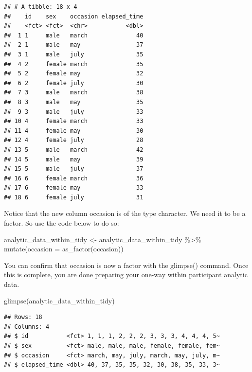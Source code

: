 \documentclass[
]{krantz}
\makeatletter
\newenvironment{Shaded}{\begin{snugshade}}{\end{snugshade}}
\newcommand{\AttributeTok}[1]{\textcolor[rgb]{0.61,0.61,0.61}{#1}}
\newcommand{\FunctionTok}[1]{\textcolor[rgb]{0,0,0}{#1}}
\newcommand{\NormalTok}[1]{#1}
\newcommand{\OtherTok}[1]{\textcolor[rgb]{0.37,0.37,0.37}{#1}}
\newcommand{\SpecialCharTok}[1]{\textcolor[rgb]{0,0,0}{#1}}
\newenvironment{kframe}{%
\medskip{}
\setlength{\fboxsep}{.8em}
 \def\at@end@of@kframe{}%
 \ifinner\ifhmode%
  \def\at@end@of@kframe{\end{minipage}}%
  \begin{minipage}{\columnwidth}%
 \fi\fi%
 \def\FrameCommand##1{\hskip\@totalleftmargin \hskip-\fboxsep
 \colorbox{shadecolor}{##1}\hskip-\fboxsep
     \hskip-\linewidth \hskip-\@totalleftmargin \hskip\columnwidth}%
 \MakeFramed {\advance\hsize-\width
   \@totalleftmargin\z@ \linewidth\hsize
   \@setminipage}}%
 {\par\unskip\endMakeFramed%
 \at@end@of@kframe}
\renewenvironment{Shaded}{\begin{kframe}}{\end{kframe}}
\makeatother
\begin{document}
\begin{verbatim}
## # A tibble: 18 x 4
##    id    sex    occasion elapsed_time
##    <fct> <fct>  <chr>           <dbl>
##  1 1     male   march              40
##  2 1     male   may                37
##  3 1     male   july               35
##  4 2     female march              35
##  5 2     female may                32
##  6 2     female july               30
##  7 3     male   march              38
##  8 3     male   may                35
##  9 3     male   july               33
## 10 4     female march              33
## 11 4     female may                30
## 12 4     female july               28
## 13 5     male   march              42
## 14 5     male   may                39
## 15 5     male   july               37
## 16 6     female march              36
## 17 6     female may                33
## 18 6     female july               31
\end{verbatim}

Notice that the new column occasion is of the type character. We need it to be a factor. So use the code below to do so:

\begin{Shaded}
\begin{Highlighting}[]
\NormalTok{analytic\_data\_within\_tidy }\OtherTok{\textless{}{-}}\NormalTok{ analytic\_data\_within\_tidy }\SpecialCharTok{\%\textgreater{}\%}
  \FunctionTok{mutate}\NormalTok{(}\AttributeTok{occasion =} \FunctionTok{as\_factor}\NormalTok{(occasion))}
\end{Highlighting}
\end{Shaded}

You can confirm that occasion is now a factor with the glimpse() command. Once this is complete, you are done preparing your one-way within participant analytic data.

\begin{Shaded}
\begin{Highlighting}[]
\FunctionTok{glimpse}\NormalTok{(analytic\_data\_within\_tidy)}
\end{Highlighting}
\end{Shaded}

\begin{verbatim}
## Rows: 18
## Columns: 4
## $ id           <fct> 1, 1, 1, 2, 2, 2, 3, 3, 3, 4, 4, 4, 5~
## $ sex          <fct> male, male, male, female, female, fem~
## $ occasion     <fct> march, may, july, march, may, july, m~
## $ elapsed_time <dbl> 40, 37, 35, 35, 32, 30, 38, 35, 33, 3~
\end{verbatim}
\end{document}
